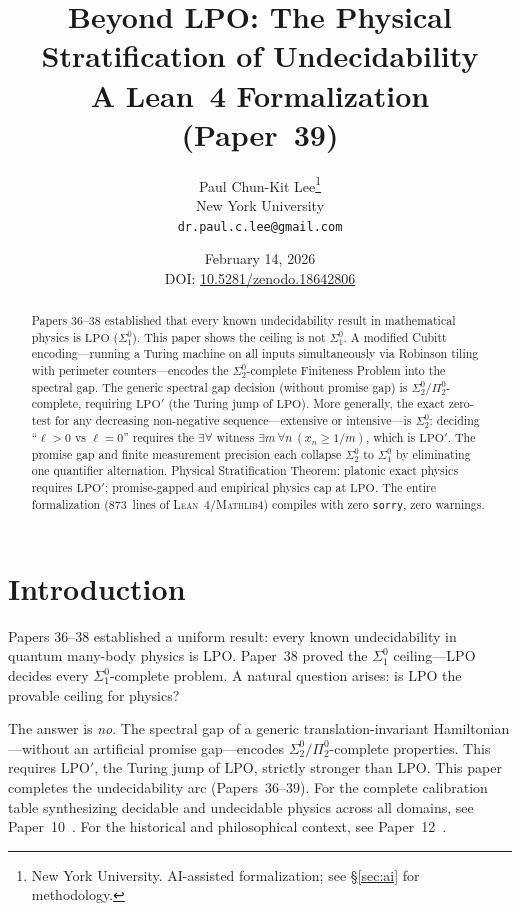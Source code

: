 \documentclass[11pt,a4paper]{article}
\title{%
  \textbf{Beyond LPO: The Physical Stratification
  of Undecidability}\\[6pt]
  {\normalsize A Lean~4 Formalization (Paper~39)}%
}
\author{
  Paul Chun-Kit Lee\thanks{%
    New York University.
    AI-assisted formalization; see \S\ref{sec:ai} for methodology.} \\
  New York University \\
  \texttt{dr.paul.c.lee@gmail.com}
}
\date{February 14, 2026\\[4pt]
  {\small DOI: \href{https://doi.org/10.5281/zenodo.18642806}{10.5281/zenodo.18642806}}}
\theoremstyle{plain}
\theoremstyle{definition}
\newcommand{\LPO}{\ensuremath{\mathrm{LPO}}}
\newcommand{\LPOj}{\ensuremath{\mathrm{LPO'}}}
\newcommand{\Lean}{\textsc{Lean~4}}
\newcommand{\Mathlib}{\textsc{Mathlib4}}
\begin{document}
\maketitle

\begin{abstract}
Papers 36--38 established that every known undecidability result in
mathematical physics is $\LPO$ ($\Sigma_1^0$).
This paper shows the ceiling is not $\Sigma_1^0$.
A modified Cubitt encoding---running a Turing machine on all inputs
simultaneously via Robinson tiling with perimeter counters---encodes
the $\Sigma_2^0$-complete Finiteness Problem into the spectral gap.
The generic spectral gap decision (without promise gap)
is $\Sigma_2^0/\Pi_2^0$-complete, requiring $\LPOj$
(the Turing jump of $\LPO$).
More generally, the exact zero-test for any decreasing non-negative
sequence---extensive or intensive---is $\Sigma_2^0$: deciding
``$\ell > 0$ vs $\ell = 0$'' requires the $\exists\forall$ witness
$\exists m\,\forall n\, (x_n \geq 1/m)$, which is $\LPOj$.
The promise gap and finite measurement precision each collapse
$\Sigma_2^0$ to $\Sigma_1^0$ by eliminating one quantifier alternation.
Physical Stratification Theorem: platonic exact physics requires
$\LPOj$; promise-gapped and empirical physics cap at $\LPO$.
The entire formalization (873~lines of \Lean{}/\Mathlib{})
compiles with zero \texttt{sorry}, zero warnings.
\end{abstract}

\section{Introduction}\label{sec:intro}

Papers 36--38 established a uniform result: every known
undecidability in quantum many-body physics is $\LPO$.
Paper~38 proved the $\Sigma_1^0$ ceiling---$\LPO$ decides every
$\Sigma_1^0$-complete problem.  A natural question arises:
is $\LPO$ the provable ceiling for physics?

The answer is \emph{no}.  The spectral gap of a generic
translation-invariant Hamiltonian---without an artificial
promise gap---encodes $\Sigma_2^0/\Pi_2^0$-complete properties.
This requires $\LPOj$, the Turing jump of $\LPO$, strictly
stronger than $\LPO$.  This paper completes the undecidability arc
(Papers~36--39).  For the complete calibration table synthesizing
decidable and undecidable physics across all domains, see
Paper~10~\cite{Lee26P10}.  For the historical and philosophical
context, see Paper~12~\cite{Lee26P12}.
\end{document}
